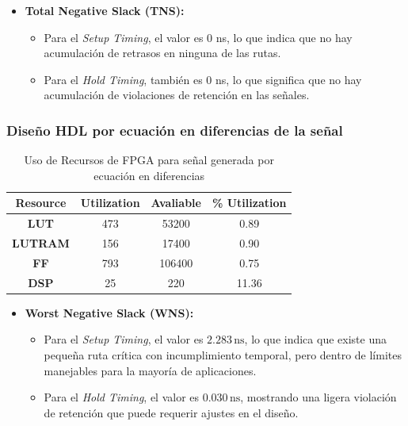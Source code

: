 \documentclass[conference]{IEEEtran}
\begin{document}
{\begin{itemize}
    \item \textbf{Total Negative Slack (TNS):}
    \begin{itemize}
        \item Para el \textit{Setup Timing}, el valor es 0 ns, lo que indica que no hay acumulación de retrasos en ninguna de las rutas.
        \item Para el \textit{Hold Timing}, también es 0 ns, lo que significa que no hay acumulación de violaciones de retención en las señales.
    \end{itemize}
\end{itemize}

\subsubsection{Diseño HDL por ecuación en diferencias de la señal}

\begin{table}[H]
\caption{Uso de Recursos de FPGA para señal generada por ecuación en diferencias}
\begin{center}
\begin{tabular}{|c|c|c|c|}
\hline
\textbf{Resource} & \textbf{Utilization} & \textbf{Avaliable} & \textbf{\% Utilization} \\
\hline
\textbf{LUT} & 473 & 53200 & 0.89 \\
\hline
\textbf{LUTRAM} & 156 & 17400 & 0.90 \\
\hline
\textbf{FF} & 793 & 106400 & 0.75 \\
\hline
\textbf{DSP} & 25 & 220 & 11.36 \\
\hline
\end{tabular}
\label{eq_dif_table_evaluation}
\end{center}
\end{table}

 




\begin{itemize}
  \item \textbf{Worst Negative Slack (WNS):}
    \begin{itemize}
        \item Para el \textit{Setup Timing}, el valor es $2.283 \, \text{ns}$, lo que indica que existe una pequeña ruta crítica con incumplimiento temporal, pero dentro de límites manejables para la mayoría de aplicaciones.
        \item Para el \textit{Hold Timing}, el valor es $0.030 \, \text{ns}$, mostrando una ligera violación de retención que puede requerir ajustes en el diseño.
    \end{itemize}
    

\end{itemize}}
\end{document}
